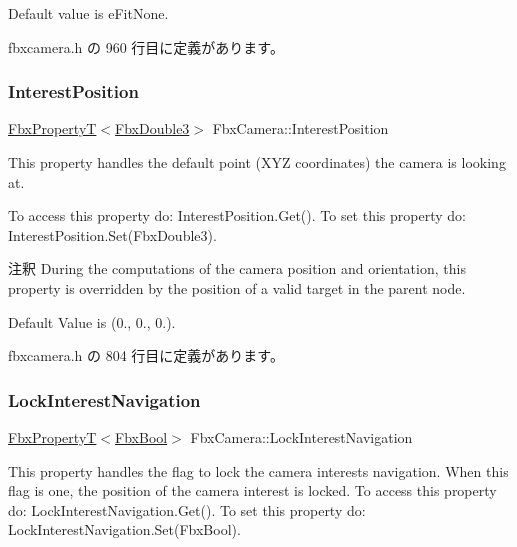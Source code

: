 Default value is e\+Fit\+None. 

 fbxcamera.\+h の 960 行目に定義があります。

\mbox{\label{class_fbx_camera_a686036fc4f1794fe7f3b74f978e8d174}} 
\subsubsection{\texorpdfstring{Interest\+Position}{InterestPosition}}
{\footnotesize\ttfamily \hyperlink{class_fbx_property_t}{Fbx\+PropertyT}$<$\hyperlink{fbxtypes_8h_ae0a96f14cde566774c7553aa7523b7a7}{Fbx\+Double3}$>$ Fbx\+Camera\+::\+Interest\+Position}

This property handles the default point (X\+YZ coordinates) the camera is looking at.

To access this property do\+: Interest\+Position.\+Get(). To set this property do\+: Interest\+Position.\+Set(\+Fbx\+Double3).

\begin{DoxyRemark}{注釈}
During the computations of the camera position and orientation, this property is overridden by the position of a valid target in the parent node.

Default Value is (0., 0., 0.). 
\end{DoxyRemark}


 fbxcamera.\+h の 804 行目に定義があります。

\mbox{\label{class_fbx_camera_a3060679e7b5d5c6ba05fd78f5bfee955}} 
\subsubsection{\texorpdfstring{Lock\+Interest\+Navigation}{LockInterestNavigation}}
{\footnotesize\ttfamily \hyperlink{class_fbx_property_t}{Fbx\+PropertyT}$<$\hyperlink{fbxtypes_8h_a92e0562b2fe33e76a242f498b362262e}{Fbx\+Bool}$>$ Fbx\+Camera\+::\+Lock\+Interest\+Navigation}

This property handles the flag to lock the camera interest\textquotesingle{}s navigation. When this flag is one, the position of the camera interest is locked. To access this property do\+: Lock\+Interest\+Navigation.\+Get(). To set this property do\+: Lock\+Interest\+Navigation.\+Set(\+Fbx\+Bool).

